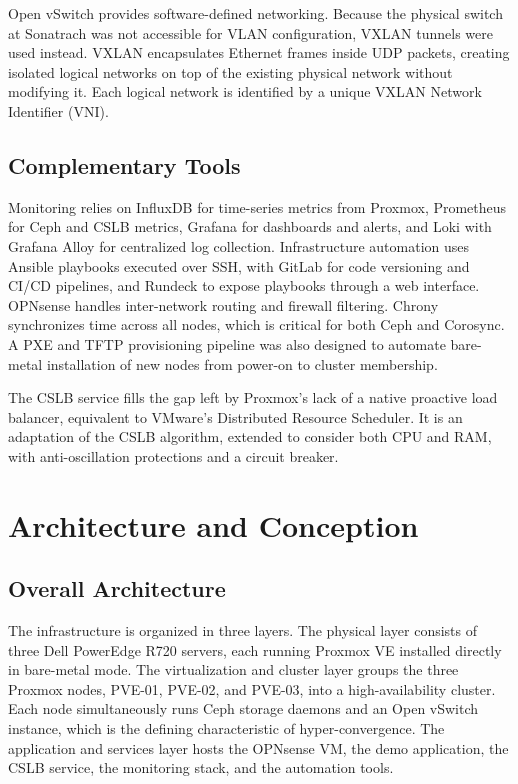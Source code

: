 \documentclass[12pt, a4paper]{article}
\begin{document}
Open vSwitch provides software-defined networking. Because the physical switch at Sonatrach was not accessible for VLAN configuration, VXLAN tunnels were used instead. VXLAN encapsulates Ethernet frames inside UDP packets, creating isolated logical networks on top of the existing physical network without modifying it. Each logical network is identified by a unique VXLAN Network Identifier (VNI).

\subsection{Complementary Tools}

Monitoring relies on InfluxDB for time-series metrics from Proxmox, Prometheus for Ceph and CSLB metrics, Grafana for dashboards and alerts, and Loki with Grafana Alloy for centralized log collection. Infrastructure automation uses Ansible playbooks executed over SSH, with GitLab for code versioning and CI/CD pipelines, and Rundeck to expose playbooks through a web interface. OPNsense handles inter-network routing and firewall filtering. Chrony synchronizes time across all nodes, which is critical for both Ceph and Corosync. A PXE and TFTP provisioning pipeline was also designed to automate bare-metal installation of new nodes from power-on to cluster membership.

The CSLB service fills the gap left by Proxmox's lack of a native proactive load balancer, equivalent to VMware's Distributed Resource Scheduler. It is an adaptation of the CSLB algorithm, extended to consider both CPU and RAM, with anti-oscillation protections and a circuit breaker.

\section{Architecture and Conception}

\subsection{Overall Architecture}

The infrastructure is organized in three layers. The physical layer consists of three Dell PowerEdge R720 servers, each running Proxmox VE installed directly in bare-metal mode. The virtualization and cluster layer groups the three Proxmox nodes, PVE-01, PVE-02, and PVE-03, into a high-availability cluster. Each node simultaneously runs Ceph storage daemons and an Open vSwitch instance, which is the defining characteristic of hyper-convergence. The application and services layer hosts the OPNsense VM, the demo application, the CSLB service, the monitoring stack, and the automation tools.
\end{document}

